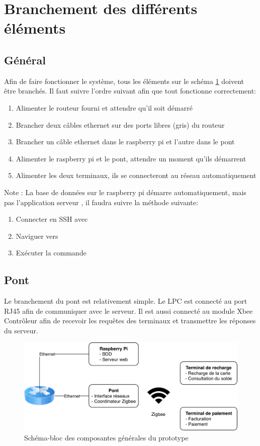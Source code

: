\section{Branchement des différents éléments}
	\subsection{Général}
	Afin de faire fonctionner le système, tous les éléments sur le schéma \ref{fig.general} doivent être branchés. Il faut suivre l’ordre suivant afin que tout fonctionne correctement:
	\begin{enumerate}
		\item Alimenter le routeur fourni et attendre qu’il soit démarré
		\item Brancher deux câbles ethernet sur des ports libres (gris) du routeur
		\item Brancher un câble ethernet dans le raspberry pi et l’autre dans le pont
		\item Alimenter le raspberry pi et le pont, attendre un moment qu’ils démarrent
		\item Alimenter les deux terminaux, ils se connecteront au réseau automatiquement
	\end{enumerate}

Note : La base de données sur le raspberry pi démarre automatiquement, mais pas l’application \og serveur \fg{}, il faudra suivre la méthode suivante:
	\begin{enumerate}
		\item Connecter en SSH avec 
		\item Naviguer vers 	
		\item Exécuter la commande 
	\end{enumerate}
	
	\subsection{Pont}
	Le branchement du pont est relativement simple. Le LPC est connecté au port RJ45 afin de communiquer avec le serveur. Il est aussi connecté au module Xbee Contrôleur afin de recevoir les requêtes des terminaux et transmettre les réponses du serveur.
	
	\begin{figure}[h]
		\includegraphics[width=\textwidth]{Pictures/Branchements/general}
		\caption{Schéma-bloc des composantes générales du prototype}
		\label{fig.general}
	\end{figure}
	
